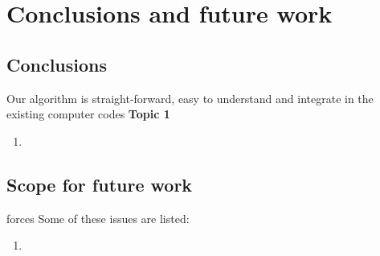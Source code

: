 
\chapter{Conclusions and future work}

\label{Chapter8} %


\section{Conclusions}

Our algorithm is straight-forward, easy to understand and integrate in the existing computer codes
\textbf{Topic 1}

\begin{enumerate}
    \item \lipsum[2]
\end{enumerate}

\section{Scope for future work}
forces
Some of these issues are listed:
\begin{enumerate}
    \item \lipsum[4]
\end{enumerate}

